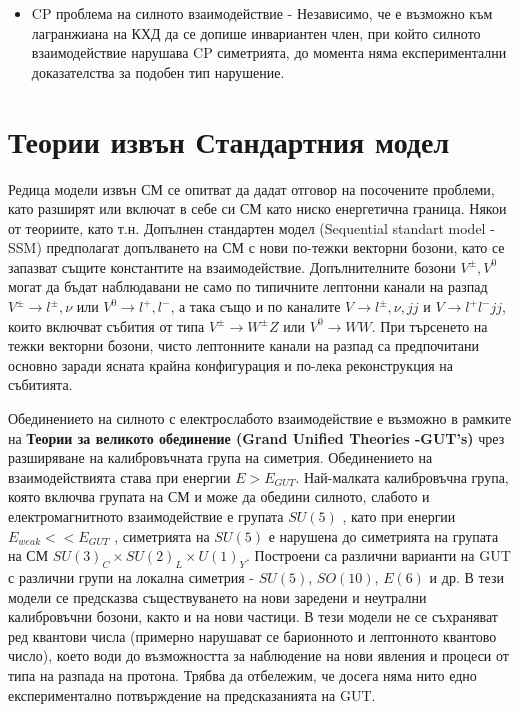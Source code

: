 \begin{itemize}
\item CP проблема на силното взаимодействие - Независимо, че е възможно към лагранжиана на КХД да се допише инвариантен член, при който силното взаимодействие нарушава CP симетрията, до момента няма експериментални доказателства за подобен тип нарушение.
\end{itemize}
\section{Теории извън Стандартния модел}
\par Редица модели извън СМ се опитват да дадат отговор на посочените проблеми, като разширят или включат в себе си СМ като ниско енергетична граница. Някои от теориите, като т.н. Допълнен стандартен модел (Sequential standart model - SSM) \cite{SSM} предполагат допълването на СМ с нови по-тежки векторни бозони, като се запазват същите константите на взаимодействие. Допълнителните бозони $V^{\pm}, V^0$ могат да бъдат наблюдавани не само по типичните лептонни канали на разпад $V^{\pm}\rightarrow l^{\pm},\nu$ или $V^0\rightarrow l^{+},l^{-}$, а така също и по каналите  $V\rightarrow l^{\pm},\nu, jj$ и  $V\rightarrow l^{+}l^{-}jj$, които включват събития от типа $V^{\pm}\rightarrow W^{\pm}Z$ или $V^0\rightarrow WW$. При търсенето на тежки векторни бозони, чисто лептонните канали на разпад са предпочитани основно заради ясната крайна конфигурация и по-лека реконструкция на събитията.
\par Обединението на силното с електрослабото взаимодействие е възможно в рамките на {\bf Теории за великото  обединение (Grand Unified Theories -GUT's)} \cite{GUT} чрез разширяване на калибровъчната група на симетрия. Обединението на взаимодействията става при енергии $E>E_{GUT}$. Най-малката калибровъчна група, която включва групата на СМ и може да обедини силното, слабото и електромагнитното взаимодействие е групата $SU(5)$ \cite{GUT1,GUT2}, като при енергии $E_{weak} << E_{GUT}$ , симетрията на $SU(5)$ е нарушена до симетрията на групата на СМ $SU(3)_C\times SU(2)_L\times U(1)_Y$. Построени са различни варианти на GUT с различни групи на локална симетрия - $SU(5)$, $SO(10)$, $E(6)$ и др. В тези модели се предсказва съществуването на нови заредени и неутрални калибровъчни бозони, както  и на нови частици. В тези модели не се съхраняват ред квантови числа (примерно нарушават се барионното и лептонното квантово число), което води до възможността за наблюдение на нови явления и процеси от типа на разпада на протона. Трябва да отбележим, че досега няма нито едно експериментално потвърждение на предсказанията на GUT.


